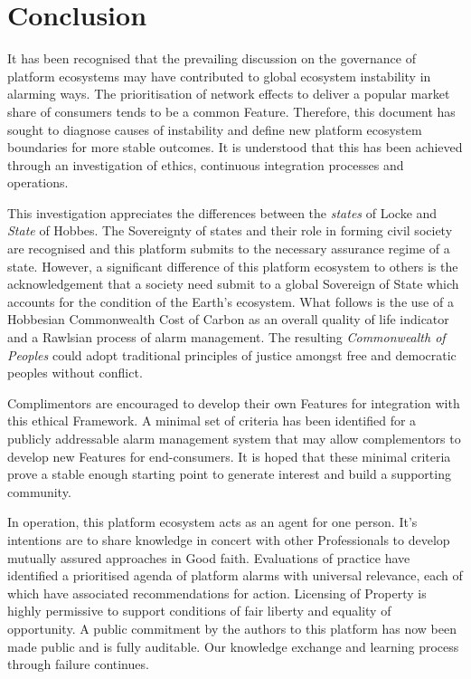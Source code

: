 \documentclass[11pt, oneside]{book}   	%
\begin{document}
\pagebreak

\chapter{Conclusion}
It has been recognised that the prevailing discussion on the governance of platform ecosystems may have contributed to global ecosystem instability in alarming ways.
The prioritisation of network effects to deliver a popular market share of consumers tends to be a common Feature.
Therefore, this document has sought to diagnose causes of instability and define new platform ecosystem boundaries for more stable outcomes.
It is understood that this has been achieved through an investigation of ethics, continuous integration processes and operations.\

This investigation appreciates the differences between the \emph{states} of Locke and \emph{State} of Hobbes.
The Sovereignty of states and their role in forming civil society are recognised and this platform submits to the necessary assurance regime of a state.
However, a significant difference of this platform ecosystem to others is the acknowledgement that a society need submit to a global Sovereign of State which accounts for the condition of the Earth's ecosystem.
What follows is the use of a Hobbesian Commonwealth Cost of Carbon as an overall quality of life indicator and a Rawlsian process of alarm management.
The resulting \emph{Commonwealth of Peoples} could adopt traditional principles of justice amongst free and democratic peoples without conflict.\

Complimentors are encouraged to develop their own Features for integration with this ethical Framework.
A minimal set of criteria has been identified for a publicly addressable alarm management system that may allow complementors to develop new Features for end-consumers.
It is hoped that these minimal criteria prove a stable enough starting point to generate interest and build a supporting community.\

In operation, this platform ecosystem acts as an agent for one person.
It's intentions are to share knowledge in concert with other Professionals to develop mutually assured approaches in Good faith.
Evaluations of practice have identified a prioritised agenda of platform alarms with universal relevance, each of which have associated recommendations for action.
Licensing of Property is highly permissive to support conditions of fair liberty and equality of opportunity.
A public commitment by the authors to this platform has now been made public and is fully auditable.
Our knowledge exchange and learning process through failure continues.\
\end{document}
